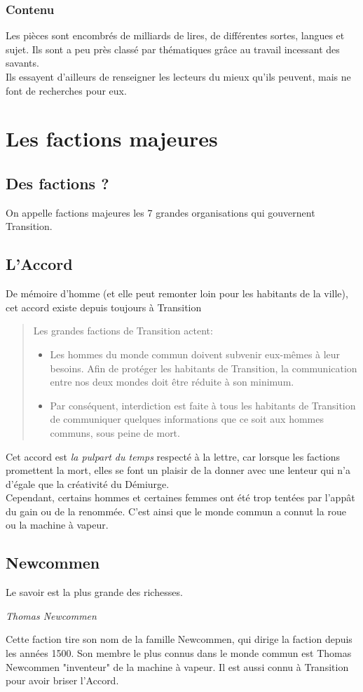\documentclass{book}
\begin{document}
\subsection{Contenu}
Les pièces sont encombrés de milliards de lires, de différentes sortes, langues et sujet. Ils sont a peu près classé par thématiques grâce au travail incessant des savants.\\
Ils essayent d'ailleurs de renseigner les lecteurs du mieux qu'ils peuvent, mais ne font de recherches pour eux.


\chapter{Les factions majeures}
\section{Des factions ?}
On appelle factions majeures les 7 grandes organisations qui gouvernent Transition.
\hypertarget{accord}{\section{L'Accord}}
De mémoire d'homme (et elle peut remonter loin pour les habitants de la ville), cet accord existe depuis toujours à Transition
\begin{quote}
	Les grandes factions de Transition actent:
	\begin{itemize}
		\item Les hommes du monde commun doivent subvenir eux-mêmes à leur besoins. Afin de protéger les habitants de Transition, la communication entre nos deux mondes doit être réduite à son minimum.
		\item Par conséquent, interdiction est faite à tous les habitants de Transition de communiquer quelques informations que ce soit aux hommes communs, sous peine de mort.
	\end{itemize}
\end{quote}
Cet accord est \emph{la pulpart du temps} respecté à la lettre, car lorsque les factions promettent la mort, elles se font un plaisir de la donner avec une lenteur qui n'a d'égale que la créativité du Démiurge.
\\
Cependant, certains hommes et certaines femmes ont été trop tentées par l'appât du gain ou de la renommée. C'est ainsi que le monde commun a connut la roue ou la machine à vapeur. 

\section{Newcommen}
\epigraph{Le savoir est la plus grande des richesses.}{\textit{Thomas Newcommen}}
Cette faction tire son nom de la famille Newcommen, qui dirige la faction depuis les années 1500. Son membre le plus connus dans le monde commun est Thomas Newcommen "inventeur" de la machine à vapeur. Il est aussi connu à Transition pour avoir briser l'Accord.
\end{document}
